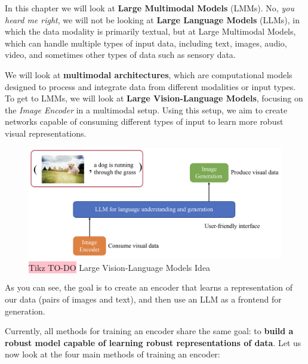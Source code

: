In this chapter we will look at \textbf{Large Multimodal Models} (LMMs). No, \textit{you heard me right}, we will not be looking at \textbf{Large Language Models} (LLMs), in which the data modality is primarily textual, but at Large Multimodal Models, which can handle multiple types of input data, including text, images, audio, video, and sometimes other types of data such as sensory data.

We will look at \textbf{multimodal architectures}, which are computational models designed to process and integrate data from different modalities or input types. To get to LMMs, we will look at \textbf{Large Vision-Language Models}, focusing on the \textit{Image Encoder} in a multimodal setup. Using this setup, we aim to create networks capable of consuming different types of input to learn more robust visual representations.

\begin{figure}[!htbp]
    \centering
    \includegraphics[width=0.75\linewidth]{tikz/chapter11 - Large Vision-Language Models.png}
    \caption{{\color{red}\colorbox{pink}{Tikz TO-DO}} Large Vision-Language Models Idea}
\end{figure}

As you can see, the goal is to create an encoder that learns a representation of our data (pairs of images and text), and then use an LLM as a frontend for generation.

Currently, all methods for training an encoder share the same goal: to \textbf{build a robust model capable of learning robust representations of data}. Let us now look at the four main methods of training an encoder:

